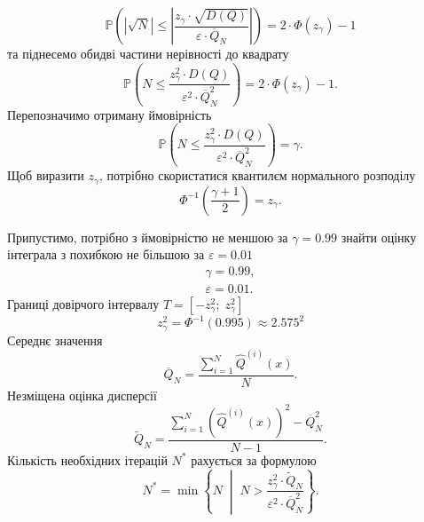 \begin{equation*}
  \mathbb{P}\left(
    \left|
      \sqrt{N}
    \right|
    \le \left|
      \frac{z_{\gamma} \cdot \sqrt{D\left( Q \right)}}
      {\varepsilon \cdot \overline{Q}_N} \right|
  \right)
  = 2 \cdot \Phi\left( z_{\gamma} \right) - 1
\end{equation*}
та піднесемо обидві частини нерівності до квадрату
\begin{equation*}
  \mathbb{P}\left(
    N
    \le \frac{z^2_{\gamma} \cdot D\left( Q \right)}
      {\varepsilon^2 \cdot \overline{Q}_N^2}
  \right)
  = 2 \cdot \Phi\left( z_{\gamma} \right) - 1.
\end{equation*}
Перепозначимо отриману ймовірність
\begin{equation*}
  \mathbb{P}\left(
    N
    \le \frac{z^2_{\gamma} \cdot D\left( Q \right)}
      {\varepsilon^2 \cdot \overline{Q}_N^2}
  \right)
  = \gamma.
\end{equation*}
Щоб виразити $z_{\gamma}$,
потрібно скористатися квантилєм нормального розподілу
\begin{equation*}
  \Phi^{-1}\left(
    \frac{\gamma + 1}{2}
  \right)
  = z_{\gamma}.
\end{equation*}

Припустимо,
потрібно з ймовірністю не меншою за $\gamma = 0.99$
знайти оцінку інтеграла з похибкою не більшою за $\varepsilon = 0.01$
\begin{equation*}
  \begin{split}
    \gamma = 0.99, \\
    \varepsilon = 0.01.
  \end{split}
\end{equation*}
Границі довірчого інтервалу $T = \left[ - z^2_{\gamma};\; z^2_{\gamma} \right]$
\begin{equation*}
  z^2_{\gamma} = \Phi^{-1}\left( 0.995 \right) \approx 2.575^2
\end{equation*}
Середнє значення
\begin{equation*}
  \overline{Q}_N = \frac{\sum\limits_{i=1}^{N}
    \hat{Q}^{\left( i \right)}\left( x \right)}{N}.
\end{equation*}
Незміщена оцінка дисперсії
\begin{equation*}
  \widetilde{Q}_N
  = \frac{
    \sum\limits_{i=1}^{N}
      \left( \hat{Q}^{\left( i \right)}\left( x \right) \right)^2
    - \overline{Q}_N^2}{N - 1}.
\end{equation*}
Кількість необхідних ітерацій $N^*$ рахується за формулою
\begin{equation*}
  N^* = \min{\left\{ N \;\middle|\;
    N > \frac{z^2_{\gamma} \cdot \widetilde{Q}_N}
    {\varepsilon^2 \cdot \overline{Q}_N^2} \right\}}.
\end{equation*}
